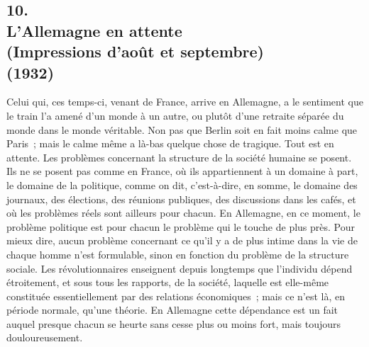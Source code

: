 \documentclass[french,twoside]{book} %
\begin{document}
\subsection[{10. L'Allemagne en attente, (Impressions d'août et septembre) (1932)}]{10. \\
L'Allemagne en attente \\
(Impressions d'août et septembre) \\
(1932)}
\noindent \par
Celui qui, ces temps-ci, venant de France, arrive en Allemagne, a le sentiment que le train l'a amené d'un monde à un autre, ou plutôt d'une retraite séparée du monde dans le monde véritable. Non pas que Berlin soit en fait moins calme que Paris ; mais le calme même a là-bas quelque chose de tragi­que. Tout est en attente. Les problèmes concernant la structure de la société humaine se posent. Ils ne se posent pas comme en France, où ils appartiennent à un domaine à part, le domaine de la politique, comme on dit, c'est-à-dire, en somme, le domaine des journaux, des élections, des réunions publiques, des discussions dans les cafés, et où les problèmes réels sont ailleurs pour chacun. En Allemagne, en ce moment, le problème politique est pour chacun le problème qui le touche de plus près. Pour mieux dire, aucun problème concer­nant ce qu'il y a de plus intime dans la vie de chaque homme n'est formulable, sinon en fonction du problème de la structure sociale. Les révolutionnaires enseignent depuis longtemps que l'individu dépend étroitement, et sous tous les rapports, de la société, laquelle est elle-même constituée essentiellement par des relations économiques ; mais ce n'est là, en période normale, qu'une théorie. En Allemagne cette dépendance est un fait auquel presque chacun se heurte sans cesse plus ou moins fort, mais toujours douloureusement.\par
\end{document}
